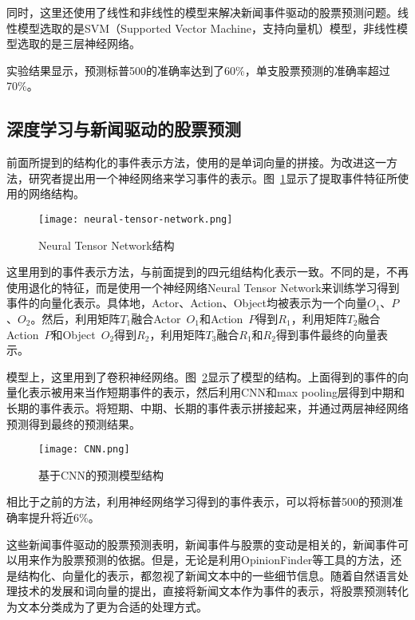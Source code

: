 同时，这里还使用了线性和非线性的模型来解决新闻事件驱动的股票预测问题。线性模型选取的是SVM（Supported Vector Machine，支持向量机）模型，非线性模型选取的是三层神经网络。

实验结果显示，预测标普500的准确率达到了60\%，单支股票预测的准确率超过70\%。

\subsection{深度学习与新闻驱动的股票预测}

前面所提到的结构化的事件表示方法，使用的是单词向量的拼接。为改进这一方法，研究者提出用一个神经网络来学习事件的表示。图~\ref{fig:neural-tensor-network}显示了提取事件特征所使用的网络结构。

\begin{figure}[ht]
    \centering 
    \texttt{[image: neural-tensor-network.png]}
    \caption{Neural Tensor Network结构}
    \label{fig:neural-tensor-network}
\end{figure}

这里用到的事件表示方法，与前面提到的四元组结构化表示一致。不同的是，不再使用退化的特征，而是使用一个神经网络Neural Tensor Network来训练学习得到事件的向量化表示。具体地，Actor、Action、Object均被表示为一个向量$O_1$、$P$、$O_2$。然后，利用矩阵$T_1$融合Actor~$O_1$和Action~$P$得到$R_1$，利用矩阵$T_2$融合Action~$P$和Object~$O_2$得到$R_2$，利用矩阵$T_3$融合$R_1$和$R_2$得到事件最终的向量表示。

模型上，这里用到了卷积神经网络。图~\ref{fig:cnn}显示了模型的结构。上面得到的事件的向量化表示被用来当作短期事件的表示，然后利用CNN和max pooling层得到中期和长期的事件表示。将短期、中期、长期的事件表示拼接起来，并通过两层神经网络预测得到最终的预测结果。

\begin{figure}[ht]
    \centering 
    \texttt{[image: CNN.png]}
    \caption{基于CNN的预测模型结构}
    \label{fig:cnn}
\end{figure}

相比于之前的方法，利用神经网络学习得到的事件表示，可以将标普500的预测准确率提升将近6\%。

这些新闻事件驱动的股票预测表明，新闻事件与股票的变动是相关的，新闻事件可以用来作为股票预测的依据。但是，无论是利用OpinionFinder等工具的方法，还是结构化、向量化的表示，都忽视了新闻文本中的一些细节信息。随着自然语言处理技术的发展和词向量的提出，直接将新闻文本作为事件的表示，将股票预测转化为文本分类成为了更为合适的处理方式。

